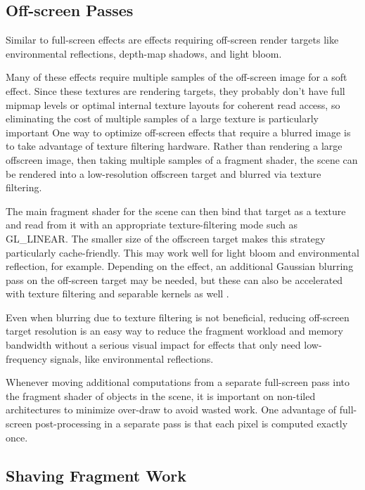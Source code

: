\subsection{Off-screen Passes}
\label{Jon-McCaffrey-Off-Screen-Pass}

Similar to full-screen effects are effects requiring off-screen render targets
like environmental reflections, depth-map shadows, and light bloom.

Many of these effects require multiple samples of the off-screen image for a
soft effect.  Since these textures are rendering targets, they probably don't
have full mipmap levels or optimal internal texture layouts for coherent read
access, so eliminating the cost of multiple samples of a large texture is
particularly important One way to optimize off-screen effects that require a
blurred image is to take advantage of texture filtering hardware.  Rather than
rendering a large offscreen image, then taking multiple samples of a fragment
shader, the scene can be rendered into a low-resolution offscreen target and
blurred via texture filtering.

The main fragment shader for the scene can then bind that target as a texture
and read from it with an appropriate texture-filtering mode such as GL\_LINEAR.
The smaller size of the offscreen target makes this strategy particularly
cache-friendly.  This may work well for light bloom and environmental
reflection, for example.  Depending on the effect, an additional Gaussian
blurring pass on the off-screen target may be needed, but these can also be
accelerated with texture filtering and separable kernels as well \cite{Rideout}.

Even when blurring due to texture filtering is not beneficial, reducing
off-screen target resolution is an easy way to reduce the fragment workload
and memory bandwidth without a serious visual impact for effects that only need
low-frequency signals, like environmental reflections.

Whenever moving additional computations from a separate full-screen pass into
the fragment shader of objects in the scene, it is important on non-tiled
architectures to minimize over-draw to avoid wasted work.  One advantage of
full-screen post-processing in a separate pass is that each pixel is computed
exactly once.

\subsection{Shaving Fragment Work}
\label{Jon-McCaffrey-Shaving-Fragment-Work}

